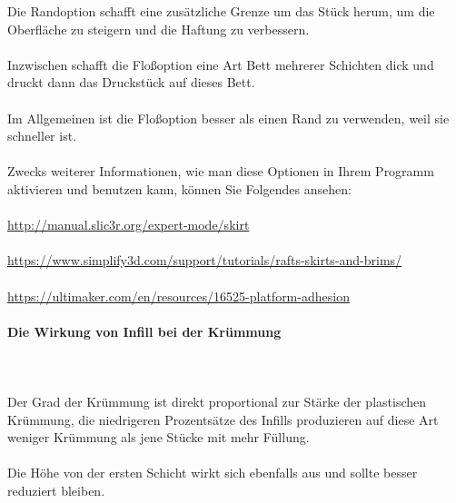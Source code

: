 \documentclass[11pt,a4paper]{article}
\begin{document}
Die Randoption schafft eine zusätzliche Grenze um das Stück herum, um die Oberfläche zu steigern und die Haftung zu verbessern.
\\\\
Inzwischen schafft die Floßoption eine Art Bett mehrerer Schichten dick und druckt dann das Druckstück auf dieses Bett.
\\\\
Im Allgemeinen ist die Floßoption besser als einen Rand zu verwenden, weil sie schneller ist.
\\\\
Zwecks weiterer Informationen, wie man diese Optionen in Ihrem Programm aktivieren und benutzen kann, können Sie Folgendes ansehen:\\\\
\url{http://manual.slic3r.org/expert-mode/skirt}\\\\
\url{https://www.simplify3d.com/support/tutorials/rafts-skirts-and-brims/}\\\\
\url{https://ultimaker.com/en/resources/16525-platform-adhesion}
			\paragraph{Die Wirkung von Infill bei der Krümmung}\mbox{}\\\\
Der Grad der Krümmung ist direkt proportional zur Stärke der plastischen Krümmung, die niedrigeren Prozentsätze des Infills produzieren auf diese Art weniger Krümmung als jene Stücke mit mehr Füllung.
\\\\
Die Höhe von der ersten Schicht wirkt sich ebenfalls aus und sollte besser reduziert bleiben.
\end{document}
